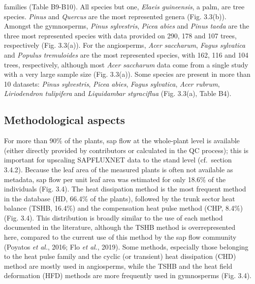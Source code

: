 \documentclass[11pt,twoside]{reedthesis}
\begin{document}
families (Table B9-B10). All species but one, \emph{Elaeis guineensis},
a palm, are tree species. \emph{Pinus} and \emph{Quercus} are the most
represented genera (Fig. 3.3(b)). Amongst the gymnosperms, \emph{Pinus
sylvestris}, \emph{Picea abies} and \emph{Pinus taeda} are the three
most represented species with data provided on 290, 178 and 107 trees,
respectively (Fig. 3.3(a)). For the angiosperms, \emph{Acer saccharum},
\emph{Fagus sylvatica} and \emph{Populus tremuloides} are the most
represented species, with 162, 116 and 104 trees, respectively, although
most \emph{Acer saccharum} data come from a single study with a very
large sample size (Fig. 3.3(a)). Some species are present in more than
10 datasets: \emph{Pinus sylvestris}, \emph{Picea abies}, \emph{Fagus
sylvatica}, \emph{Acer rubrum}, \emph{Liriodendron tulipifera} and
\emph{Liquidambar styraciflua} (Fig. 3.3(a), Table B4).\par

\subsection{Methodological aspects}\label{methodological-aspects}

For more than 90\% of the plants, sap flow at the whole-plant level is
available (either directly provided by contributors or calculated in the
QC process); this is important for upscaling SAPFLUXNET data to the
stand level (cf.~section 3.4.2). Because the leaf area of the measured
plants is often not available as metadata, sap flow per unit leaf area
was estimated for only 18.6\% of the individuals (Fig. 3.4). The heat
dissipation method is the most frequent method in the database (HD,
66.4\% of the plants), followed by the trunk sector heat balance (TSHB,
16.4\%) and the compensation heat pulse method (CHP, 8.4\%) (Fig. 3.4).
This distribution is broadly similar to the use of each method
documented in the literature, although the TSHB method is
overrepresented here, compared to the current use of this method by the
sap flow community (Poyatos \emph{et al.}, 2016; Flo \emph{et al.},
2019). Some methods, especially those belonging to the heat pulse family
and the cyclic (or transient) heat dissipation (CHD) method are mostly
used in angiosperms, while the TSHB and the heat field deformation (HFD)
methods are more frequently used in gymnosperms (Fig. 3.4).\par
\end{document}
